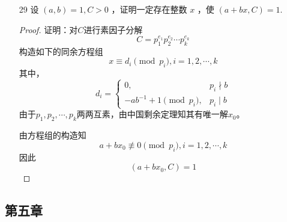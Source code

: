 \begin{enumerate}
    \item[29] 设 $(a, b)=1, C>0$ ，证明一定存在整数 $x$ ，使 $(a+b x, C)=1.$

    \begin{proof}
        证明：对$C$进行素因子分解
        \begin{equation*}
            C = p_1^{e_1} p_2^{e_2} \cdots p_k^{e_k}
        \end{equation*}
        构造如下的同余方程组
        \begin{equation*}
            x \equiv d_i \pmod{p_i}, i=1,2,\cdots,k
        \end{equation*}
        其中，
        \begin{equation*}
            d_i = \begin{cases}
                0, & p_i \nmid b \\
                -a b^{-1} + 1 \pmod{p_i}, & p_i \mid b
                \end{cases}
        \end{equation*}
        由于$p_1, p_2, \cdots, p_k$两两互素，由中国剩余定理知其有唯一解$x_0$。

        由方程组的构造知
        \begin{equation*}
            a + b x_0 \not\equiv 0 \pmod{p_i}, i=1,2,\cdots,k
        \end{equation*}
        因此
        \begin{equation*}
            (a + b x_0, C) = 1
        \end{equation*}
    \end{proof}
\end{enumerate}

\subsection*{第五章}

